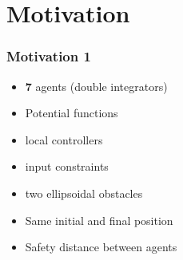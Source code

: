 \section{Motivation}
\label{sec:motivation}
\begin{frame}
    \frametitle{Motivation 1}
	\begin{itemize}
		\item \textbf{7} agents (double integrators)
		\item Potential functions
 		\item local controllers
 		\item input constraints
 		\item two ellipsoidal obstacles
 		\item Same initial and final position
 		\item Safety distance between agents
	\end{itemize}
\end{frame}	
